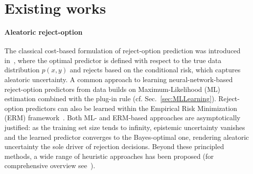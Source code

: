 \section{Existing works}
\vspace{-0.1cm}

\paragraph{Aleatoric reject-option}
The classical cost-based formulation of reject-option prediction was introduced in~\cite{Chow-RejectOpt-TIT1970}, where the optimal predictor is defined with respect to the true data distribution $p(x,y)$ and rejects based on the conditional risk, which captures aleatoric uncertainty. A common approach to learning neural-network-based reject-option predictors from data builds on Maximum-Likelihood (ML) estimation combined with the plug-in rule (cf. Sec.~\ref{sec:MLLearning}). Reject-option predictors can also be learned within the Empirical Risk Minimization (ERM) framework~\cite{Yuan-ClassiRejOpt-JMLR2010}. Both ML- and ERM-based approaches are asymptotically justified: as the training set size tends to infinity, epistemic uncertainty vanishes and the learned predictor converges to the Bayes-optimal one, rendering aleatoric uncertainty the sole driver of rejection decisions. Beyond these principled methods, a wide range of heuristic approaches has been proposed (for comprehensive overview see~\cite{Hendrickx-MLwithRejectOpt-ML2024}).

\vspace{-0.3cm}



